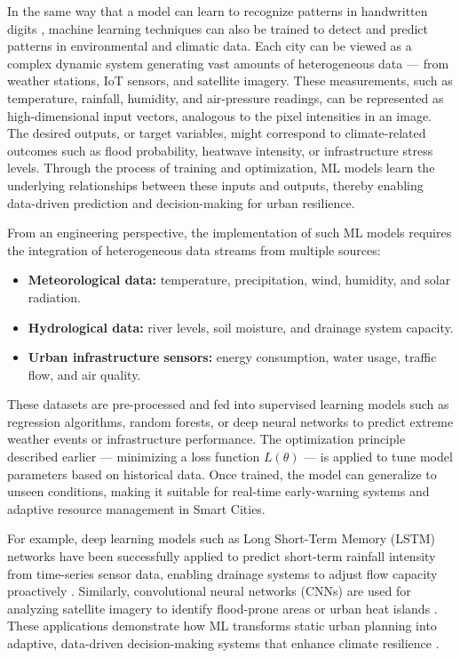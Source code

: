 \documentclass[12pt]{article}
\begin{document}
In the same way that a model can learn to recognize patterns in handwritten digits \cite{bishop2006pattern}, machine learning techniques can also be trained to detect and predict patterns in environmental and climatic data. 
Each city can be viewed as a complex dynamic system generating vast amounts of heterogeneous data --- from weather stations, IoT sensors, and satellite imagery. 
These measurements, such as temperature, rainfall, humidity, and air-pressure readings, can be represented as high-dimensional input vectors, analogous to the pixel intensities in an image. 
The desired outputs, or target variables, might correspond to climate-related outcomes such as flood probability, heatwave intensity, or infrastructure stress levels. 
Through the process of training and optimization, ML models learn the underlying relationships between these inputs and outputs, thereby enabling data-driven prediction and decision-making for urban resilience.

From an engineering perspective, the implementation of such ML models requires the integration of heterogeneous data streams from multiple sources:
\begin{itemize}
    \item \textbf{Meteorological data:} temperature, precipitation, wind, humidity, and solar radiation.
    \item \textbf{Hydrological data:} river levels, soil moisture, and drainage system capacity.
    \item \textbf{Urban infrastructure sensors:} energy consumption, water usage, traffic flow, and air quality.
\end{itemize}

These datasets are pre-processed and fed into supervised learning models such as regression algorithms, random forests, or deep neural networks to predict extreme weather events or infrastructure performance. 
The optimization principle described earlier --- minimizing a loss function \( L(\theta) \) --- is applied to tune model parameters based on historical data. 
Once trained, the model can generalize to unseen conditions, making it suitable for real-time early-warning systems and adaptive resource management in Smart Cities.

For example, deep learning models such as Long Short-Term Memory (LSTM) networks have been successfully applied to predict short-term rainfall intensity from time-series sensor data, enabling drainage systems to adjust flow capacity proactively \cite{kratzert2019towards}. 
Similarly, convolutional neural networks (CNNs) are used for analyzing satellite imagery to identify flood-prone areas or urban heat islands \cite{rolnick2022tackling}. 
These applications demonstrate how ML transforms static urban planning into adaptive, data-driven decision-making systems that enhance climate resilience \cite{mohanty2020ai,li2021sponge}.
\end{document}
